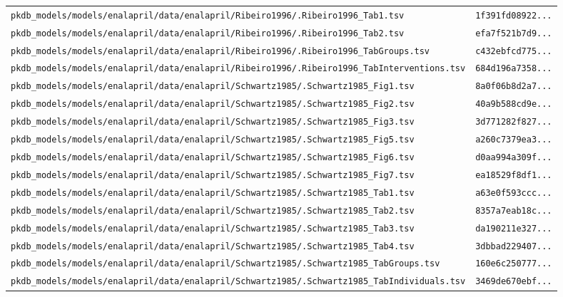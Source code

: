 \begin{longtable}{ll}
\texttt{pkdb\_models/models/enalapril/data/enalapril/Ribeiro1996/.Ribeiro1996\_Tab1.tsv} & \texttt{1f391fd08922...} \\
\texttt{pkdb\_models/models/enalapril/data/enalapril/Ribeiro1996/.Ribeiro1996\_Tab2.tsv} & \texttt{efa7f521b7d9...} \\
\texttt{pkdb\_models/models/enalapril/data/enalapril/Ribeiro1996/.Ribeiro1996\_TabGroups.tsv} & \texttt{c432ebfcd775...} \\
\texttt{pkdb\_models/models/enalapril/data/enalapril/Ribeiro1996/.Ribeiro1996\_TabInterventions.tsv} & \texttt{684d196a7358...} \\
\texttt{pkdb\_models/models/enalapril/data/enalapril/Schwartz1985/.Schwartz1985\_Fig1.tsv} & \texttt{8a0f06b8d2a7...} \\
\texttt{pkdb\_models/models/enalapril/data/enalapril/Schwartz1985/.Schwartz1985\_Fig2.tsv} & \texttt{40a9b588cd9e...} \\
\texttt{pkdb\_models/models/enalapril/data/enalapril/Schwartz1985/.Schwartz1985\_Fig3.tsv} & \texttt{3d771282f827...} \\
\texttt{pkdb\_models/models/enalapril/data/enalapril/Schwartz1985/.Schwartz1985\_Fig5.tsv} & \texttt{a260c7379ea3...} \\
\texttt{pkdb\_models/models/enalapril/data/enalapril/Schwartz1985/.Schwartz1985\_Fig6.tsv} & \texttt{d0aa994a309f...} \\
\texttt{pkdb\_models/models/enalapril/data/enalapril/Schwartz1985/.Schwartz1985\_Fig7.tsv} & \texttt{ea18529f8df1...} \\
\texttt{pkdb\_models/models/enalapril/data/enalapril/Schwartz1985/.Schwartz1985\_Tab1.tsv} & \texttt{a63e0f593ccc...} \\
\texttt{pkdb\_models/models/enalapril/data/enalapril/Schwartz1985/.Schwartz1985\_Tab2.tsv} & \texttt{8357a7eab18c...} \\
\texttt{pkdb\_models/models/enalapril/data/enalapril/Schwartz1985/.Schwartz1985\_Tab3.tsv} & \texttt{da190211e327...} \\
\texttt{pkdb\_models/models/enalapril/data/enalapril/Schwartz1985/.Schwartz1985\_Tab4.tsv} & \texttt{3dbbad229407...} \\
\texttt{pkdb\_models/models/enalapril/data/enalapril/Schwartz1985/.Schwartz1985\_TabGroups.tsv} & \texttt{160e6c250777...} \\
\texttt{pkdb\_models/models/enalapril/data/enalapril/Schwartz1985/.Schwartz1985\_TabIndividuals.tsv} & \texttt{3469de670ebf...} \\

\end{longtable}
